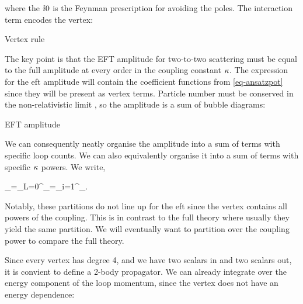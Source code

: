 \documentclass[
  10pt,
  a4paper,
  DIV=11,
  numbers=noendperiod,
  twoside]{scrreprt}
\let\[\relax \let\]\relax %
\DeclareRobustCommand{\[}{\begin{equation}}
\DeclareRobustCommand{\]}{\end{equation}}
\begin{document}
where the \(\mathring{\imath} 0\) is the Feynman prescription for avoiding the poles.
The interaction term encodes the vertex:

\hypertarget{fig-vertex}{}
{
\makeatletter
\def\LT@makecaption#1#2#3{%
  \noalign{\smash{\hbox{\kern\textwidth\rlap{\kern\marginparsep
  \parbox[t]{\marginparwidth}{%
    \footnotesize{%
      \vspace{(1.1\baselineskip)}
    #1{#2: }\ignorespaces #3}}}}}}%
    }
\makeatother



\label{fig-vertex}Vertex rule

}

The key point is that the EFT amplitude for two-to-two scattering must
be equal to the full amplitude at every order in the coupling constant
\(\kappa\). The expression for the \gls{eft} amplitude will contain
the coefficient functions from \ref{eq-ansatzpot} since they will be
present as vertex terms. Particle number must be conserved in the
non-relativistic limit , so the amplitude is a sum of bubble diagrams:

\hypertarget{fig-eftampl}{}
{
\makeatletter
\def\LT@makecaption#1#2#3{%
  \noalign{\smash{\hbox{\kern\textwidth\rlap{\kern\marginparsep
  \parbox[t]{\marginparwidth}{%
    \footnotesize{%
      \vspace{(1.1\baselineskip)}
    #1{#2: }\ignorespaces #3}}}}}}%
    }
\makeatother



\label{fig-eftampl}EFT amplitude

}

We can consequently neatly organise the amplitude into a sum of terms
with specific loop counts. We can also equivalently organise it into a
sum of terms with specific \(\kappa\) powers. We write,

\[\ampl_=\sum\limits_{L=0}^\infty{}_=\sum\limits_{i=1}^\infty \ampl[(i)]_.\]

Notably, these partitions do not line up for the \gls{eft} since the
vertex contains all powers of the coupling. This is in contrast to the
full theory where usually they yield the same partition. We will
eventually want to partition over the coupling power to compare the full
theory.

Since every vertex has degree 4, and we have two scalars in and two
scalars out, it is convient to define a 2-body propagator. We can
already integrate over the energy component of the loop momentum, since
the vertex does not have an energy dependence:
\end{document}

